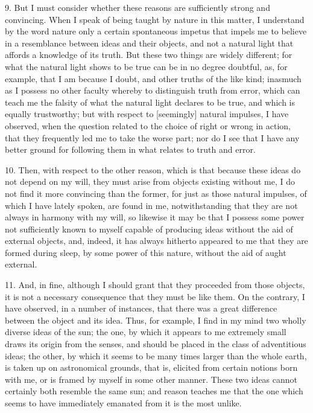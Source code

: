 9. But I must consider whether these reasons are sufficiently strong and convincing. When I speak of being taught by nature in this matter, I understand by the word nature only a certain spontaneous impetus that impels me to believe in a resemblance between ideas and their objects, and not a natural light that affords a knowledge of its truth. But these two things are widely different; for what the natural light shows to be true can be in no degree doubtful, as, for example, that I am because I doubt, and other truths of the like kind; inasmuch as I possess no other faculty whereby to distinguish truth from error, which can teach me the falsity of what the natural light declares to be true, and which is equally trustworthy; but with respect to [seemingly] natural impulses, I have observed, when the question related to the choice of right or wrong in action, that they frequently led me to take the worse part; nor do I see that I have any better ground for following them in what relates to truth and error.

10. Then, with respect to the other reason, which is that because these ideas do not depend on my will, they must arise from objects existing without me, I do not find it more convincing than the former, for just as those natural impulses, of which I have lately spoken, are found in me, notwithstanding that they are not always in harmony with my will, so likewise it may be that I possess some power not sufficiently known to myself capable of producing ideas without the aid of external objects, and, indeed, it has always hitherto appeared to me that they are formed during sleep, by some power of this nature, without the aid of aught external.

11. And, in fine, although I should grant that they proceeded from those objects, it is not a necessary consequence that they must be like them. On the contrary, I have observed, in a number of instances, that there was a great difference between the object and its idea. Thus, for example, I find in my mind two wholly diverse ideas of the sun; the one, by which it appears to me extremely small draws its origin from the senses, and should be placed in the class of adventitious ideas; the other, by which it seems to be many times larger than the whole earth, is taken up on astronomical grounds, that is, elicited from certain notions born with me, or is framed by myself in some other manner. These two ideas cannot certainly both resemble the same sun; and reason teaches me that the one which seems to have immediately emanated from it is the most unlike.

